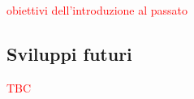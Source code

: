 
\textcolor{red}{obiettivi dell'introduzione al passato}

\subsection{Sviluppi futuri}

\textcolor{red}{TBC}

